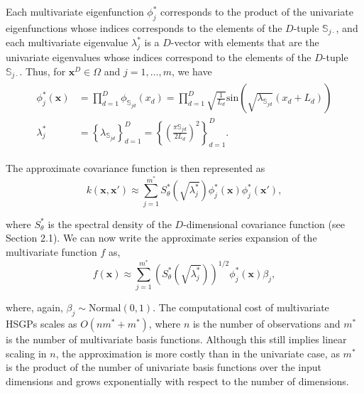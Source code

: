 \documentclass[]{interact}
\theoremstyle{plain}%
\theoremstyle{definition}
\theoremstyle{remark}
\begin{document}
Each multivariate eigenfunction $\phi^{\ast}_j$ corresponds to the product of the univariate eigenfunctions whose indices corresponds to the elements of the $D$-tuple $\mathbb{S}_{j\cdotp}$, and each multivariate eigenvalue $\lambda^{\ast}_j$ is a $D$-vector with elements that are the univariate eigenvalues whose indices correspond to the elements of the $D$-tuple $\mathbb{S}_{j\cdotp}$. Thus, for $\mathbf{x}^D \in \Omega$ and $j=1,\ldots,m$, we have 
%
\begin{align} \label{bf&lambda_multi}
\begin{split}
\phi^{\ast}_j(\mathbf{x}) &= \prod_{d=1}^{D} \phi_{\mathbb{S}_{jd}}(x_d) = \prod_{d=1}^{D} \sqrt{\frac{1}{L_d}} \text{sin}\left(\sqrt{\lambda_{\mathbb{S}_{jd}}}(x_d+L_d)\right) \\
%
\lambda^{\ast}_j &= \left\{ \lambda_{\mathbb{S}_{jd}} \right\}_{d=1}^D =  \left\{ \left(\tfrac{\pi \mathbb{S}_{jd}}{2L_d}\right)^2 \right\}_{d=1}^D. 
\end{split}
\end{align}

\noindent The approximate covariance function is then represented as
%
\begin{equation}\label{approxcov_multi}
k(\mathbf{x},\mathbf{x}') \approx \sum_{j=1}^{m^{\ast}} 
S^{\ast}_{\theta}\left(\sqrt{\lambda^{\ast}_j}\right)
\phi^{\ast}_j(\mathbf{x}) \phi^{\ast}_j(\mathbf{x}'),
\end{equation}

\noindent where $S^{\ast}_{\theta}$ is the spectral density of the $D$-dimensional covariance function (see Section 2.1). We can now write the approximate series expansion of the multivariate function $f$ as,
%
\begin{equation}\label{approxf}
f(\mathbf{x}) \approx \sum_{j=1}^{m^{\ast}} 
\left( S^{\ast}_{\theta} \left(\sqrt{\lambda^{\ast}_j} \right)\right)^{1/2}
\phi^{\ast}_j(\mathbf{x}) \beta_j, 
\end{equation}

\noindent where, again, $\beta_j \sim \text{Normal}(0,1)$. The computational cost of multivariate HSGPs scales as $O(n m^{\ast} + m^{\ast})$, where $n$ is the number of observations and $m^{\ast}$ is the number of multivariate basis functions. Although this still implies linear scaling in $n$, the approximation is more costly than in the univariate case, as $m^{\ast}$ is the product of the number of univariate basis functions over the input dimensions and grows exponentially with respect to the number of  dimensions.
\end{document}
